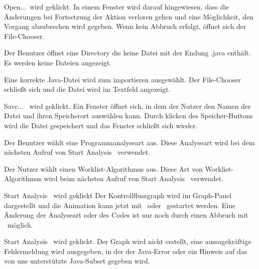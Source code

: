 {\glqq Open...\grqq\ wird geklickt.}
{In einem Fenster wird darauf hingewiesen, dass die Änderungen bei Fortsetzung der Aktion verloren gehen und eine Möglichkeit, den Vorgang abzubrechen wird gegeben. Wenn kein Abbruch erfolgt, öffnet sich der File-Chooser.}

{Der Benutzer öffnet eine Directory die keine Datei mit der Endung .java enthält.}
{Es werden keine Dateien angezeigt.}

{Eine korrekte Java-Datei wird zum importieren ausgewählt.}
{Der File-Chooser schließt sich und die Datei wird im Textfeld angezeigt.}

{\glqq Save... \grqq\ wird geklickt.}
{Ein Fenster öffnet sich, in dem der Nutzer den Namen der Datei und ihren Speicherort auswählen kann. Durch klicken des \glqq Speicher\grqq -Buttons wird die Datei gespeichert und das Fenster schließt sich wieder.}


\tests{}

{Der Benutzer wählt eine Programmanalyseart aus.}
{Diese Analyseart wird bei dem nächsten Aufruf von \glqq Start Analysis \grqq\ verwendet.}

{Der Nutzer wählt einen Worklist-Algorithmus aus.}
{Diese Art von Worklist-Algorithmus wird beim nächsten Aufruf von \glqq Start Analysis \grqq\ verwendet.}


\tests{}

{\glqq Start Analysis \grqq\ wird geklickt}
{Der Kontrollflussgraph wird im Graph-Panel dargestellt und die Animation kann jetzt mit \faStepForward\ oder \faPlay\ gestartet werden. Eine Änderung der Analyseart oder des Codes ist nur noch durch einen Abbruch mit \faStop\ möglich.}

{\glqq Start Analysis \grqq\ wird geklickt.}
{Der Graph wird nicht erstellt, eine aussagekräftige Fehlermeldung wird ausgegeben, in der der Java-Error oder ein Hinweis auf das von uns unterstützte Java-Subset gegeben wird.}

